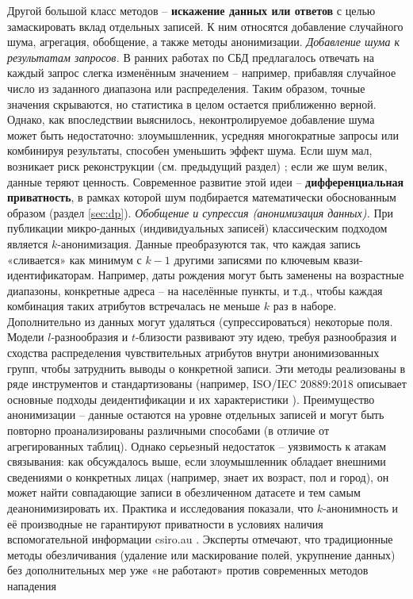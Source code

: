 Другой большой класс методов – \textbf{искажение данных или ответов} с целью замаскировать вклад отдельных записей. К ним относятся добавление случайного шума, агрегация, обобщение, а также методы анонимизации. \textit{Добавление шума к результатам запросов.} В ранних работах по СБД предлагалось отвечать на каждый запрос слегка изменённым значением – например, прибавляя случайное число из заданного диапазона или распределения. Таким образом, точные значения скрываются, но статистика в целом остается приближенно верной. Однако, как впоследствии выяснилось, неконтролируемое добавление шума может быть недостаточно: злоумышленник, усредняя многократные запросы или комбинируя результаты, способен уменьшить эффект шума. Если шум мал, возникает риск реконструкции (см. предыдущий раздел)
\autocite{differentialprivacy-org}
; если же шум велик, данные теряют ценность. Современное развитие этой идеи – \textbf{дифференциальная приватность}, в рамках которой шум подбирается математически обоснованным образом (раздел \ref{sec:dp}). \textit{Обобщение и супрессия (анонимизация данных).} При публикации микро-данных (индивидуальных записей) классическим подходом является $k$-анонимизация. Данные преобразуются так, что каждая запись «сливается» как минимум с $k-1$ другими записями по ключевым квази-идентификаторам. Например, даты рождения могут быть заменены на возрастные диапазоны, конкретные адреса – на населённые пункты, и т.д., чтобы каждая комбинация таких атрибутов встречалась не меньше $k$ раз в наборе. Дополнительно из данных могут удаляться (супрессироваться) некоторые поля. Модели $l$-разнообразия и $t$-близости развивают эту идею, требуя разнообразия и сходства распределения чувствительных атрибутов внутри анонимизованных групп, чтобы затруднить выводы о конкретной записи. Эти методы реализованы в ряде инструментов и стандартизованы (например, ISO/IEC 20889:2018 описывает основные подходы деидентификации и их характеристики
\autocite{iapp-org}
). Преимущество анонимизации – данные остаются на уровне отдельных записей и могут быть повторно проанализированы различными способами (в отличие от агрегированных таблиц). Однако серьезный недостаток – уязвимость к атакам связывания: как обсуждалось выше, если злоумышленник обладает внешними сведениями о конкретных лицах (например, знает их возраст, пол и город), он может найти совпадающие записи в обезличенном датасете и тем самым деанонимизировать их. Практика и исследования показали, что $k$-анонимность и её производные не гарантируют приватности в условиях наличия вспомогательной информации
csiro.au
. Эксперты отмечают, что традиционные методы обезличивания (удаление или маскирование полей, укрупнение данных) без дополнительных мер уже «не работают» против современных методов нападения
